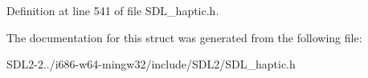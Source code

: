 Definition at line 541 of file S\+D\+L\+\_\+haptic.\+h.



The documentation for this struct was generated from the following file\+:\begin{DoxyCompactItemize}
\item 
S\+D\+L2-\/2../i686-\/w64-\/mingw32/include/\+S\+D\+L2/S\+D\+L\+\_\+haptic.\+h\end{DoxyCompactItemize}
